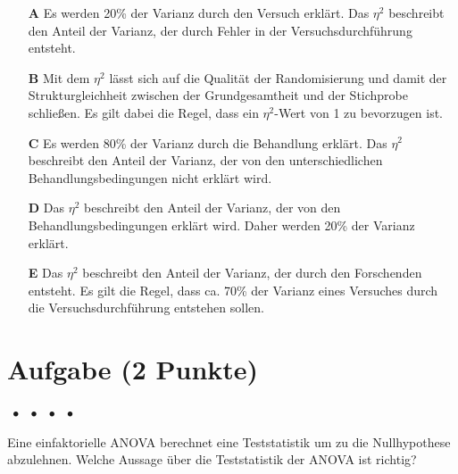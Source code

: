 \documentclass[a4paper, 9pt]{scrartcl}\usepackage[]{graphicx}\usepackage[]{xcolor}
\begin{document}
\begin{enumerate}
\item [\textbf{A} \msquare] Es werden 20\% der Varianz durch den Versuch erklärt. Das $\eta^2$ beschreibt den Anteil der Varianz, der durch Fehler in der Versuchsdurchführung entsteht.
\item [\textbf{B} \msquare] Mit dem $\eta^2$ lässt sich auf die Qualität der Randomisierung und damit der Strukturgleichheit zwischen der Grundgesamtheit und der Stichprobe schließen. Es gilt dabei die Regel, dass ein $\eta^2$-Wert von 1 zu bevorzugen ist.
\item [\textbf{C} \msquare] Es werden 80\% der Varianz durch die Behandlung erklärt. Das $\eta^2$ beschreibt den Anteil der Varianz, der von den unterschiedlichen Behandlungsbedingungen nicht erklärt wird.
\item [\textbf{D} \msquare] Das $\eta^2$ beschreibt den Anteil der Varianz, der von den Behandlungsbedingungen erklärt wird. Daher werden 20\% der Varianz erklärt.
\item [\textbf{E} \msquare] Das $\eta^2$ beschreibt den Anteil der Varianz, der durch den Forschenden entsteht. Es gilt die Regel, dass ca. 70\% der Varianz eines Versuches durch die Versuchsdurchführung entstehen sollen.
\end{enumerate}

\section{Aufgabe \hfill (2 Punkte)}

\ifcollection
\begin{flushright}
\tiny\vspace{-2Ex}
\textbf{\examinhaltstart}
\exammodulemathstat $\;\bullet$
\exammodulestat $\;\bullet$
\exammodulestatbbv $\;\bullet$
\exammodulestatversuch $\;\bullet$
\exammodulebiostat
\vspace{-1Ex}
\end{flushright}
\fi




Eine einfaktorielle ANOVA berechnet eine Teststatistik um zu die Nullhypothese abzulehnen. Welche Aussage über die Teststatistik der ANOVA ist richtig?
\end{document}
